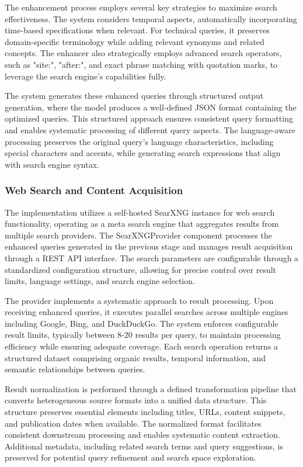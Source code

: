 \documentclass[fleqn,moreauthors,10pt]{ds_report}
\begin{document}
The enhancement process employs several key strategies to maximize search effectiveness. The system considers temporal aspects, automatically incorporating time-based specifications when relevant. For technical queries, it preserves domain-specific terminology while adding relevant synonyms and related concepts. The enhancer also strategically employs advanced search operators, such as "site:", "after:", and exact phrase matching with quotation marks, to leverage the search engine's capabilities fully.

The system generates these enhanced queries through structured output generation, where the model produces a well-defined JSON format containing the optimized queries. This structured approach ensures consistent query formatting and enables systematic processing of different query aspects. The language-aware processing preserves the original query's language characteristics, including special characters and accents, while generating search expressions that align with search engine syntax.
  
\subsubsection*{Web Search and Content Acquisition}
The implementation utilizes a self-hosted SearXNG instance for web search functionality, operating as a meta search engine that aggregates results from multiple search providers. The SearXNGProvider component processes the enhanced queries generated in the previous stage and manages result acquisition through a REST API interface. The search parameters are configurable through a standardized configuration structure, allowing for precise control over result limits, language settings, and search engine selection.

The provider implements a systematic approach to result processing. Upon receiving enhanced queries, it executes parallel searches across multiple engines including Google, Bing, and DuckDuckGo. The system enforces configurable result limits, typically between 8-20 results per query, to maintain processing efficiency while ensuring adequate coverage. Each search operation returns a structured dataset comprising organic results, temporal information, and semantic relationships between queries.

Result normalization is performed through a defined transformation pipeline that converts heterogeneous source formats into a unified data structure. This structure preserves essential elements including titles, URLs, content snippets, and publication dates when available. The normalized format facilitates consistent downstream processing and enables systematic content extraction. Additional metadata, including related search terms and query suggestions, is preserved for potential query refinement and search space exploration.
  
\end{document}
